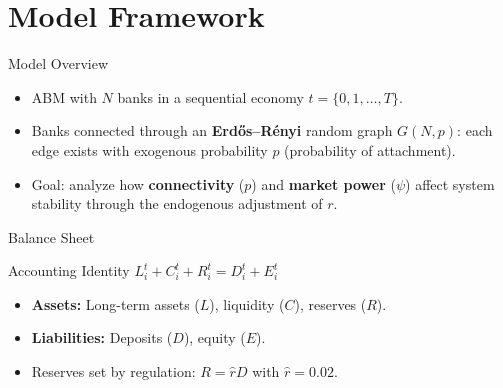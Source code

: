 


\section{Model Framework}\label{sec:3}

\begin{frame}{Model Overview}
  \begin{itemize}
    \item ABM with $N$ banks in a sequential economy $t = \{0, 1, \dots, T\}$.
    \item Banks connected through an \textbf{Erd\H{o}s--R\'enyi} random graph $G(N, p)$: each edge exists with exogenous probability $p$ (probability of attachment).
    \item Goal: analyze how \textbf{connectivity} ($p$) and \textbf{market power} ($\psi$) affect system stability through the endogenous adjustment of $r$.
  \end{itemize}
\end{frame}

\begin{frame}{Balance Sheet}
  \begin{block}{Accounting Identity}
    \centering
    $L^t_i + C^t_i + R^t_i = D^t_i + E^t_i$
  \end{block}
  \begin{itemize}
    \item \textbf{Assets:} Long-term assets ($L$), liquidity ($C$), reserves ($R$).
    \item \textbf{Liabilities:} Deposits ($D$), equity ($E$).
    \item Reserves set by regulation: $R = \hat{r} D$ with $\hat{r} = 0.02$.
  \end{itemize}
\end{frame}

